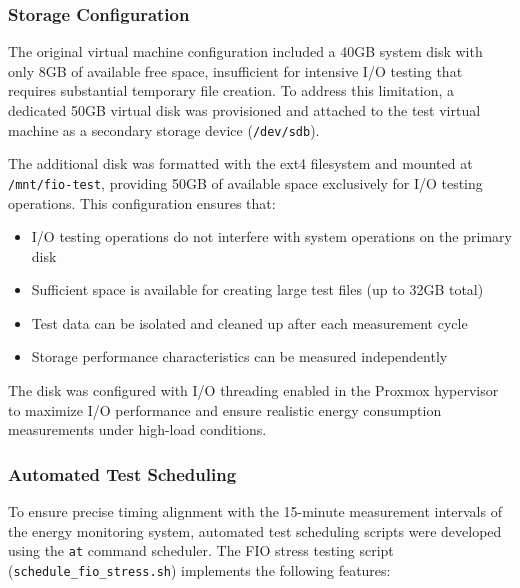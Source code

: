 \subsubsection{Storage Configuration}
\label{methodology:storage-configuration}
The original virtual machine configuration included a 40GB system disk with only 8GB of available
free space, insufficient for intensive I/O testing that requires substantial temporary file creation.
To address this limitation, a dedicated 50GB virtual disk was provisioned and attached to the test
virtual machine as a secondary storage device (\texttt{/dev/sdb}).

The additional disk was formatted with the ext4 filesystem and mounted at \texttt{/mnt/fio-test},
providing 50GB of available space exclusively for I/O testing operations. This configuration
ensures that:

\begin{itemize}
    \item I/O testing operations do not interfere with system operations on the primary disk
    \item Sufficient space is available for creating large test files (up to 32GB total)
    \item Test data can be isolated and cleaned up after each measurement cycle
    \item Storage performance characteristics can be measured independently
\end{itemize}

The disk was configured with I/O threading enabled in the Proxmox hypervisor to maximize I/O
performance and ensure realistic energy consumption measurements under high-load conditions.

\subsubsection{Automated Test Scheduling}
\label{methodology:automated-test-scheduling}
To ensure precise timing alignment with the 15-minute measurement intervals of the energy
monitoring system, automated test scheduling scripts were developed using the \texttt{at}
command scheduler. The FIO stress testing script (\texttt{schedule\_fio\_stress.sh}) implements
the following features:

